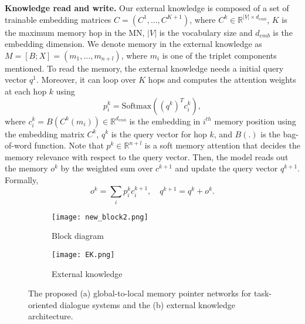 \documentclass{article} \usepackage{iclr2019_conference,times}
\newcommand{\R}{\mathbb{R}}
\begin{document}
\textbf{Knowledge read and write.} Our external knowledge is composed of a set of trainable embedding matrices $C = (C^1,\dots,C^{K+1})$, where $C^k \in \R^{|V|\times d_{emb}}$, $K$ is the maximum memory hop in the MN, $|V|$ is the vocabulary size and $d_{emb}$ is the embedding dimension. We denote memory in the external knowledge as $M = [B; X] = (m_1,\dots,m_{n+l})$, where $m_i$ is one of the triplet components mentioned. To read the memory, the external knowledge needs a initial query vector $q^1$. Moreover, it can loop over $K$ hops and computes the attention weights at each hop $k$ using 
\begin{equation}
  p^k_i = \text{Softmax}((q^k)^T c^k_i),
  \label{attn_eq}
\end{equation}
where $c^k_i = B(C^k(m_i)) \in \R^{d_{emb}}$ is the embedding in $i^{th}$ memory position using the embedding matrix $C^k$, $q^k$ is the query vector for hop $k$, and $B(.)$ is the bag-of-word function. Note that $p^k \in \R^{n+l}$ is a soft memory attention that decides the memory relevance with respect to the query vector. Then, the model reads out the memory $o^k$ by the weighted sum over $c^{k+1}$ and update the query vector $q^{k+1}$. Formally,
\begin{equation}
    o^k = \sum_i p^k_i c^{k+1}_i, \quad q^{k+1} = q^{k} + o^{k}.
\end{equation}

\begin{figure}[t]
\begin{subfigure}{0.65\textwidth}
  \centering
  \texttt{[image: new\_block2.png]}
  \caption{Block diagram}
\end{subfigure}\begin{subfigure}{0.35\textwidth}
  \centering
  \texttt{[image: EK.png]}
  \caption{External knowledge}
\end{subfigure}\caption{The proposed (a) global-to-local memory pointer networks for task-oriented dialogue systems and the (b) external knowledge architecture. }
\label{FIG:MODEL1}
\end{figure}
\end{document}
